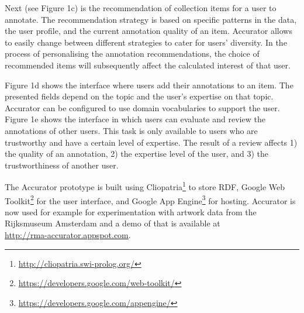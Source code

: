 Next (see Figure 1c) is the recommendation of collection items for a user to annotate. The recommendation strategy is based on specific patterns in the data, the user profile, and the current annotation quality of an item. Accurator allows to easily change between different strategies to cater for users' diversity.
In the process of personalising the annotation recommendations, the choice of recommended items will subsequently affect the calculated interest of that user.

Figure 1d shows the interface where users add their annotations to an item. The presented fields depend on the topic and the user's expertise on that topic. 
Accurator can be configured to use domain vocabularies to support the user. Figure 1e shows the interface in which users can evaluate and review the annotations of other users. This task is only available to users who are trustworthy and have a certain level of expertise. The result of a review affects 1) the quality of an annotation, 2) the expertise level of the user, and 3) the trustworthiness of another user.

The Accurator prototype is built using Cliopatria\footnote{\url{http://cliopatria.swi-prolog.org/}} to store RDF, Google Web Toolkit\footnote{\url{https://developers.google.com/web-toolkit/}} for the user interface, and Google App Engine\footnote{\url{https://developers.google.com/appengine/}}  for hosting. Accurator is now used for example for experimentation with artwork data from the Rijksmuseum Amsterdam and a demo of that is available at 
\\ \url{http://rma-accurator.appspot.com}.



